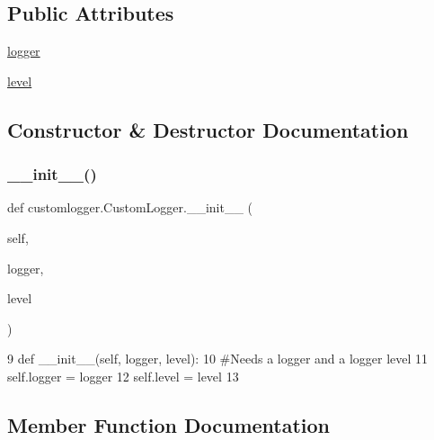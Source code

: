 \subsection*{Public Attributes}
\begin{DoxyCompactItemize}
\item 
\hyperlink{classcustomlogger_1_1CustomLogger_a800aa033e5fd2a8fc1e108a6046fd7fe}{logger}
\item 
\hyperlink{classcustomlogger_1_1CustomLogger_aa1e8b5f7e7dd6b9a1c2db6e66f3c3da6}{level}
\end{DoxyCompactItemize}


\subsection{Constructor \& Destructor Documentation}
\mbox{\label{classcustomlogger_1_1CustomLogger_ad0fa3a11a371fa6b445768b0b9e8fe03}} 
\subsubsection{\texorpdfstring{\+\_\+\+\_\+init\+\_\+\+\_\+()}{\_\_init\_\_()}}
{\footnotesize\ttfamily def customlogger.\+Custom\+Logger.\+\_\+\+\_\+init\+\_\+\+\_\+ (\begin{DoxyParamCaption}\item[{}]{self,  }\item[{}]{logger,  }\item[{}]{level }\end{DoxyParamCaption})}


\begin{DoxyCode}
9      \textcolor{keyword}{def }\_\_init\_\_(self, logger, level):
10           \textcolor{comment}{#Needs a logger and a logger level}
11           self.logger = logger
12           self.level = level
13           
\end{DoxyCode}


\subsection{Member Function Documentation}
\mbox{\label{classcustomlogger_1_1CustomLogger_ae4e52add9e53df464b370744233b16f7}} 
